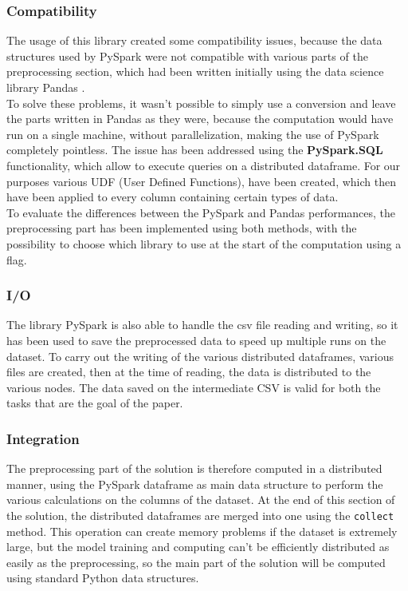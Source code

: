 \documentclass[
	letterpaper, %
	10pt, %
]{class}
\begin{document}
\subsubsection{Compatibility}

The usage of this library created some compatibility issues, because the data structures used by PySpark were not compatible with various parts of the preprocessing section, which had been written initially using the data science library Pandas \cite{pandas}.\\

To solve these problems, it wasn't possible to simply use a conversion and leave the parts written in Pandas as they were, because the computation would have run on a single machine, without parallelization, making the use of PySpark completely pointless.
The issue has been addressed using the \textbf{PySpark.SQL} functionality, which allow to execute queries on a distributed dataframe. For our purposes various UDF (User Defined Functions), have been created, which then have been applied to every column containing certain types of data.\\

To evaluate the differences between the PySpark and Pandas performances, the preprocessing part has been implemented using both methods, with the possibility to choose which library to use at the start of the computation using a flag.

\subsubsection{I/O}

The library PySpark is also able to handle the csv file reading and writing, so it has been used to save the preprocessed data to speed up multiple runs on the dataset. To carry out the writing of the various distributed dataframes, various files are created, then at the time of reading, the data is distributed to the various nodes. The data saved on the intermediate CSV is valid for both the tasks that are the goal of the paper.\\

\subsubsection{Integration}

The preprocessing part of the solution is therefore computed in a distributed manner, using the PySpark dataframe as main data structure to perform the various calculations on the columns of the dataset.
At the end of this section of the solution, the distributed dataframes are merged into one using the \texttt{collect} method. This operation can create memory problems if the dataset is extremely large, but the model training and computing can't be efficiently distributed
as easily as the preprocessing, so the main part of the solution will be computed using standard Python data structures.
\end{document}
